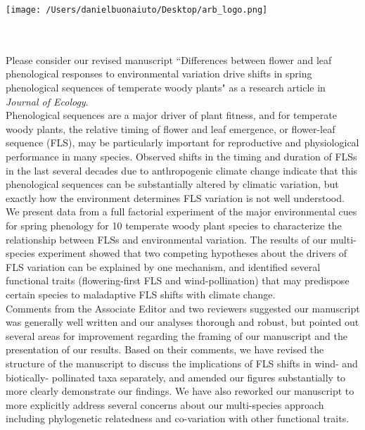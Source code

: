 \documentclass[11.75 pt]{article}\usepackage[]{graphicx}\usepackage[]{color}
\begin{document}

\def\labelitemi{--}
\parindent=24pt
\noindent\texttt{[image: /Users/danielbuonaiuto/Desktop/arb\_logo.png]}
\\\\
\\
\vspace{1.5ex}

\noindent Please consider our revised manuscript ``Differences between flower and leaf phenological responses to environmental variation drive shifts in spring phenological sequences of temperate woody plants" as a research article in \textit{Journal of Ecology}.\\

\noindent Phenological sequences are a major driver of plant fitness, and for temperate woody plants, the relative timing of flower and leaf emergence, or flower-leaf sequence (FLS), may be particularly important for reproductive and physiological performance in many species. Observed shifts in the timing and duration of FLSs in the last several decades due to anthropogenic climate change indicate that this phenological sequences can be substantially altered by climatic variation, but exactly how the environment determines FLS variation is not well understood. We present data from a full factorial experiment of the major environmental cues for spring phenology for 10 temperate woody plant species to characterize the relationship between FLSs and environmental variation. The results of our multi-species experiment showed that two competing hypotheses about the drivers of FLS variation can be explained by one mechanism, and identified several functional traits (flowering-first FLS and wind-pollination) that may predispose certain species to maladaptive FLS shifts with climate change.\\

\noindent Comments from the Associate Editor and two reviewers suggested our manuscript was generally well written and our analyses thorough and robust, but pointed out several areas for improvement regarding the framing of our manuscript and the presentation of our results. Based on their comments, we have revised the structure of the manuscript to discuss the implications of FLS shifts in wind- and biotically- pollinated taxa separately, and amended our figures substantially to more clearly demonstrate our findings. We have also reworked our manuscript to more explicitly address several concerns about our multi-species approach including phylogenetic relatedness and co-variation with other functional traits.\\
\end{document}
